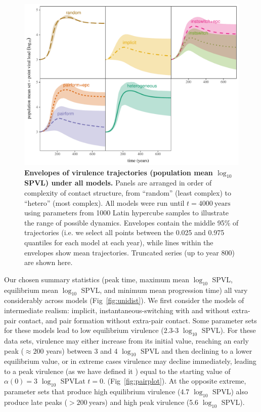 \documentclass[10pt,letterpaper]{article}
\renewcommand{\figurename}{Fig}
\newcommand{\Lspvl}{$\log_{10}$ SPVL}
\begin{document}
\begin{figure}[!ht]
\includegraphics[width=\textwidth]{../figures/fig2.pdf}
\caption{\textbf{Envelopes of virulence trajectories (population mean \Lspvl) under all models.}
Panels are arranged in order of complexity of contact structure, from 
``random'' (least complex) to ``hetero'' (most complex).
All models were run until $t=4000~\textrm{years}$ using parameters from 1000 Latin hypercube samples to illustrate the range of possible dynamics. Envelopes contain the middle 95\% of trajectories (i.e. we select all points between the 0.025 and 0.975 quantiles for each model at each year), while lines within the envelopes show mean trajectories. Truncated series (up to year 800) are shown here.}
\label{fig:virtraj}
\end{figure}

Our chosen summary statistics (peak time, maximum mean \Lspvl, equilibrium mean \Lspvl, and minimum mean progression time) 
all vary considerably across models
(\figurename~\ref{fig:unidist}).
We first consider the models of intermediate realism: implicit,
instantaneous-switching with and without extra-pair contact, and
pair formation without extra-pair contact. 
Some parameter
sets for these models lead to low equilibrium virulence ($2.3$-$3$ \Lspvl).
For these data sets, virulence may either increase from its initial value,
reaching an early peak ($\approx 200$ years) between 3 and 4 \Lspvl
and then declining to a lower equilibrium value, or in extreme cases
virulence may decline immediately, leading to a peak virulence (as we have
defined it ) equal to the starting value of $\alpha(0)=3$ \Lspvl at $t=0$.
(\figurename~\ref{fig:pairplot}).
At the opposite extreme, parameter sets that produce high equilibrium virulence (4.7 \Lspvl)
also produce late peaks ($> 200~\text{years}$) and
high peak virulence (5.6 \Lspvl).
\end{document}
